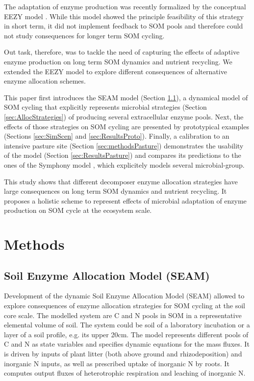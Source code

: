 The adaptation of enzyme production was recently
formalized by the conceptual EEZY model \citep{Moorhead12}. While this model
showed the principle feasibility of this strategy in short term, it did not
implement feedback to SOM pools and therefore could not study
consequences for longer term SOM cycling. 

Out task, therefore, was to tackle the need of capturing the effects of adaptive
enzyme production on long term SOM dynamics and nutrient recycling. We extended
the EEZY model to explore different consequences of alternative enzyme
allocation schemes.

This paper first introduces the SEAM model (Section \ref{sec:SEAM}), a
dynamical model of SOM cycling that explicitly represents microbial strategies
(Section \ref{sec:AllocStrategies}) of producing several extracellular enzyme
pools. Next, the effects of those strategies on SOM cycling are presented by
prototypical examples (Sections \ref{sec:SimScen} and \ref{sec:ResultsProto}).
Finally, a calibration to an intensive pasture site (Section
\ref{sec:methodsPasture}) demonstrates the usability of the model (Section
\ref{sec:ResultsPasture}) and compares its predictions to the ones of
the Symphony model \citep{Perveen14}, which explicitely models several
microbial-group.

This study shows that different decomposer enzyme allocation strategies
have large consequences on long term SOM dynamics and nutrient recycling. It
proposes a holistic scheme to represent effects of microbial adaptation of
enzyme production on SOM cycle at the ecosystem scale.


\section{Methods}
\subsection{Soil Enzyme Allocation Model (SEAM)}
\label{sec:SEAM}

Development of the dynamic Soil Enzyme Allocation Model
(SEAM) allowed to explore consequences of enzyme allocation strategies for SOM
cycling at the soil core scale. The modelled system are C and N
pools in SOM in a representative elemental volume of soil. The
system could be soil of a laboratory incubation or a layer of a soil profile,
e.g. its upper 20cm.
The model represents different pools of C and N as state variables
and specifies dynamic equations for the mass fluxes. It is driven by inputs of
plant litter (both above ground and rhizodeposition) and inorganic N
inputs, as well as prescribed uptake of inorganic N by roots.  It
computes output fluxes of heterotrophic respiration and leaching of inorganic
N.

